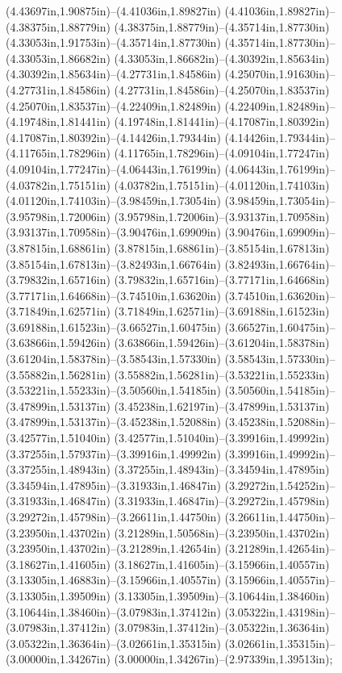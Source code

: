 (4.43697in,1.90875in)--(4.41036in,1.89827in) (4.41036in,1.89827in)--(4.38375in,1.88779in) (4.38375in,1.88779in)--(4.35714in,1.87730in) (4.33053in,1.91753in)--(4.35714in,1.87730in) (4.35714in,1.87730in)--(4.33053in,1.86682in) (4.33053in,1.86682in)--(4.30392in,1.85634in) (4.30392in,1.85634in)--(4.27731in,1.84586in) (4.25070in,1.91630in)--(4.27731in,1.84586in) (4.27731in,1.84586in)--(4.25070in,1.83537in) (4.25070in,1.83537in)--(4.22409in,1.82489in) (4.22409in,1.82489in)--(4.19748in,1.81441in) (4.19748in,1.81441in)--(4.17087in,1.80392in) (4.17087in,1.80392in)--(4.14426in,1.79344in) (4.14426in,1.79344in)--(4.11765in,1.78296in) (4.11765in,1.78296in)--(4.09104in,1.77247in) (4.09104in,1.77247in)--(4.06443in,1.76199in) (4.06443in,1.76199in)--(4.03782in,1.75151in) (4.03782in,1.75151in)--(4.01120in,1.74103in) (4.01120in,1.74103in)--(3.98459in,1.73054in) (3.98459in,1.73054in)--(3.95798in,1.72006in) (3.95798in,1.72006in)--(3.93137in,1.70958in) (3.93137in,1.70958in)--(3.90476in,1.69909in) (3.90476in,1.69909in)--(3.87815in,1.68861in) (3.87815in,1.68861in)--(3.85154in,1.67813in) (3.85154in,1.67813in)--(3.82493in,1.66764in) (3.82493in,1.66764in)--(3.79832in,1.65716in) (3.79832in,1.65716in)--(3.77171in,1.64668in) (3.77171in,1.64668in)--(3.74510in,1.63620in) (3.74510in,1.63620in)--(3.71849in,1.62571in) (3.71849in,1.62571in)--(3.69188in,1.61523in) (3.69188in,1.61523in)--(3.66527in,1.60475in) (3.66527in,1.60475in)--(3.63866in,1.59426in) (3.63866in,1.59426in)--(3.61204in,1.58378in) (3.61204in,1.58378in)--(3.58543in,1.57330in) (3.58543in,1.57330in)--(3.55882in,1.56281in) (3.55882in,1.56281in)--(3.53221in,1.55233in) (3.53221in,1.55233in)--(3.50560in,1.54185in) (3.50560in,1.54185in)--(3.47899in,1.53137in) (3.45238in,1.62197in)--(3.47899in,1.53137in) (3.47899in,1.53137in)--(3.45238in,1.52088in) (3.45238in,1.52088in)--(3.42577in,1.51040in) (3.42577in,1.51040in)--(3.39916in,1.49992in) (3.37255in,1.57937in)--(3.39916in,1.49992in) (3.39916in,1.49992in)--(3.37255in,1.48943in) (3.37255in,1.48943in)--(3.34594in,1.47895in) (3.34594in,1.47895in)--(3.31933in,1.46847in) (3.29272in,1.54252in)--(3.31933in,1.46847in) (3.31933in,1.46847in)--(3.29272in,1.45798in) (3.29272in,1.45798in)--(3.26611in,1.44750in) (3.26611in,1.44750in)--(3.23950in,1.43702in) (3.21289in,1.50568in)--(3.23950in,1.43702in) (3.23950in,1.43702in)--(3.21289in,1.42654in) (3.21289in,1.42654in)--(3.18627in,1.41605in) (3.18627in,1.41605in)--(3.15966in,1.40557in) (3.13305in,1.46883in)--(3.15966in,1.40557in) (3.15966in,1.40557in)--(3.13305in,1.39509in) (3.13305in,1.39509in)--(3.10644in,1.38460in) (3.10644in,1.38460in)--(3.07983in,1.37412in) (3.05322in,1.43198in)--(3.07983in,1.37412in) (3.07983in,1.37412in)--(3.05322in,1.36364in) (3.05322in,1.36364in)--(3.02661in,1.35315in) (3.02661in,1.35315in)--(3.00000in,1.34267in) (3.00000in,1.34267in)--(2.97339in,1.39513in);

